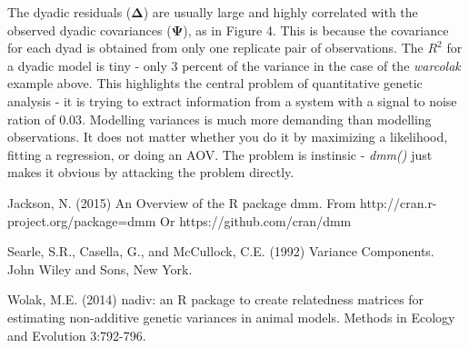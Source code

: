 \documentclass[titlepage]{article}  %
\begin{document}
The dyadic residuals ($\bm{\Delta}$) are usually large and highly correlated with the observed dyadic covariances ($\bm{\Psi}$), as in Figure 4. This is because the covariance for each dyad is obtained from only one replicate pair of observations. The $R^{2}$ for a dyadic model is tiny - only 3 percent of the variance in the case of the {\em warcolak} example above. This highlights the central problem of quantitative genetic analysis - it is trying to extract information from a system with a signal to noise ration of $0.03$. Modelling variances is much more demanding than modelling observations. It does not matter whether you do it by maximizing a likelihood, fitting a regression, or doing an AOV. The problem is instinsic - {\em dmm()} just makes it obvious by attacking the problem directly.

\begin{thebibliography}{99}

Jackson, N. (2015) An Overview of the R package dmm.
    From http://cran.r-project.org/package=dmm 
    Or https://github.com/cran/dmm

Searle, S.R., Casella, G., and McCullock, C.E. (1992) Variance Components.
    John Wiley and Sons, New York.

Wolak, M.E. (2014) nadiv: an R package to create relatedness matrices for
    estimating non-additive genetic variances in animal models.
    Methods in Ecology and Evolution 3:792-796.
\end{thebibliography}
\end{document}
